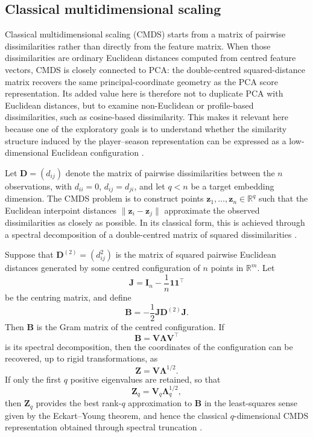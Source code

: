 \subsection{Classical multidimensional scaling}

Classical multidimensional scaling (CMDS) starts from a matrix of pairwise dissimilarities rather than directly from the feature matrix. When those dissimilarities are ordinary Euclidean distances computed from centred feature vectors, CMDS is closely connected to PCA: the double-centred squared-distance matrix recovers the same principal-coordinate geometry as the PCA score representation. Its added value here is therefore not to duplicate PCA with Euclidean distances, but to examine non-Euclidean or profile-based dissimilarities, such as cosine-based dissimilarity. This makes it relevant here because one of the exploratory goals is to understand whether the similarity structure induced by the player--season representation can be expressed as a low-dimensional Euclidean configuration \cite{torgerson1958theory,borg2005mds,cox2001mds}.

Let $\mathbf{D}=(d_{ij})$ denote the matrix of pairwise dissimilarities between the $n$ observations, with $d_{ii}=0$, $d_{ij}=d_{ji}$, and let $q<n$ be a target embedding dimension. The CMDS problem is to construct points $\mathbf{z}_1,\ldots,\mathbf{z}_n\in\mathbb{R}^q$ such that the Euclidean interpoint distances $\|\mathbf{z}_i-\mathbf{z}_j\|$ approximate the observed dissimilarities as closely as possible. In its classical form, this is achieved through a spectral decomposition of a double-centred matrix of squared dissimilarities \cite{torgerson1958theory,borg2005mds}.

\begin{theorem}
Suppose that $\mathbf{D}^{(2)}=(d_{ij}^2)$ is the matrix of squared pairwise Euclidean distances generated by some centred configuration of $n$ points in $\mathbb{R}^m$. Let
\[
\mathbf{J}=\mathbf{I}_n-\frac{1}{n}\mathbf{1}\mathbf{1}^\top
\]
be the centring matrix, and define
\[
\mathbf{B}=-\frac{1}{2}\mathbf{J}\mathbf{D}^{(2)}\mathbf{J}.
\]
Then $\mathbf{B}$ is the Gram matrix of the centred configuration. If
\[
\mathbf{B}=\mathbf{V}\mathbf{\Lambda}\mathbf{V}^\top
\]
is its spectral decomposition, then the coordinates of the configuration can be recovered, up to rigid transformations, as
\[
\mathbf{Z}=\mathbf{V}\mathbf{\Lambda}^{1/2}.
\]
If only the first $q$ positive eigenvalues are retained, so that
\[
\mathbf{Z}_q=\mathbf{V}_q\mathbf{\Lambda}_q^{1/2},
\]
then $\mathbf{Z}_q$ provides the best rank-$q$ approximation to $\mathbf{B}$ in the least-squares sense given by the Eckart--Young theorem, and hence the classical $q$-dimensional CMDS representation obtained through spectral truncation \cite{torgerson1958theory,cox2001mds,borg2005mds}.
\end{theorem}

